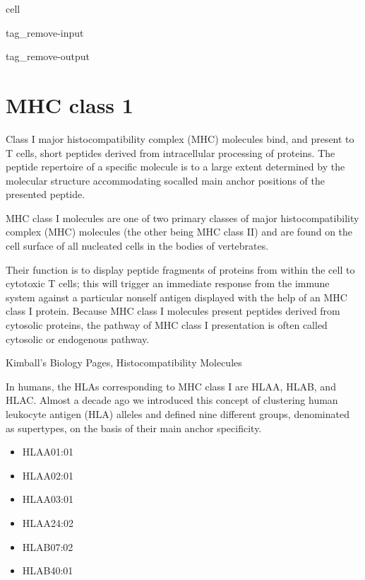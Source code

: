 \documentclass[letterpaper,10pt,english]{jupyterBook}
\begin{document}
\begin{sphinxuseclass}{cell}
\begin{sphinxuseclass}{tag_remove-input}
\begin{sphinxuseclass}{tag_remove-output}
\end{sphinxuseclass}
\end{sphinxuseclass}
\end{sphinxuseclass}

\section{MHC class 1}
\label{\detokenize{ipynb/chapter4:mhc-class-1}}
\sphinxAtStartPar
Class I major histocompatibility complex (MHC) molecules bind, and present to T cells, short peptides derived from intracellular processing of proteins. The peptide repertoire of a specific molecule is to a large extent determined by the molecular structure accommodating so\sphinxhyphen{}called main anchor positions of the presented peptide.

\sphinxAtStartPar
MHC class I molecules are one of two primary classes of major histocompatibility complex (MHC) molecules (the other being MHC class II) and are found on the cell surface of all nucleated cells in the bodies of vertebrates.

\sphinxAtStartPar
Their function is to display peptide fragments of proteins from within the cell to cytotoxic T cells; this will trigger an immediate response from the immune system against a particular non\sphinxhyphen{}self antigen displayed with the help of an MHC class I protein. Because MHC class I molecules present peptides derived from cytosolic proteins, the pathway of MHC class I presentation is often called cytosolic or endogenous pathway.%
\begin{footnote}[1]\sphinxAtStartFootnote
Kimball’s Biology Pages, Histocompatibility Molecules
%
\end{footnote}

\sphinxAtStartPar
In humans, the HLAs corresponding to MHC class I are HLA\sphinxhyphen{}A, HLA\sphinxhyphen{}B, and HLA\sphinxhyphen{}C. Almost a decade ago we introduced this concept of clustering human leukocyte antigen (HLA) alleles and defined nine different groups, denominated as supertypes, on the basis of their main anchor specificity.
\begin{itemize}
\item {} 
\sphinxAtStartPar
HLA\sphinxhyphen{}A01:01

\item {} 
\sphinxAtStartPar
HLA\sphinxhyphen{}A02:01

\item {} 
\sphinxAtStartPar
HLA\sphinxhyphen{}A03:01

\item {} 
\sphinxAtStartPar
HLA\sphinxhyphen{}A24:02

\item {} 
\sphinxAtStartPar
HLA\sphinxhyphen{}B07:02

\item {} 
\sphinxAtStartPar
HLA\sphinxhyphen{}B40:01

\end{itemize}
\end{document}
